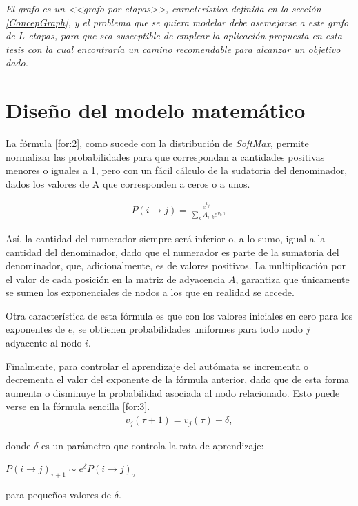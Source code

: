 \textit{El grafo es un <<grafo por etapas>>, característica definida en la sección \ref{ConcepGraph}, y el problema que se quiera modelar debe asemejarse a este grafo de $L$ etapas, para que sea susceptible de emplear la aplicación propuesta en esta tesis con la cual encontraría un camino recomendable para alcanzar un objetivo dado.}

\section{Diseño del modelo matemático}
\label{mat}
La fórmula \ref{for:2}, como sucede con la distribución de \textit{SoftMax}, permite normalizar las probabilidades para que correspondan a cantidades positivas menores o iguales a 1, pero con un fácil cálculo de la sudatoria del denominador, dados los valores de A que corresponden a ceros o a unos. 

\begin{eqnarray}\label{for:2}
P(i \to j) = \frac{e^{v_j}}{\sum_k A_{i,k} e^{v_k}},
\end{eqnarray}


Así, la cantidad del numerador siempre será inferior o,  a lo sumo, igual a la cantidad del denominador, dado que el numerador es parte de la sumatoria del denominador, que, adicionalmente, es de valores positivos. La multiplicación por el valor de cada posición en la matriz de adyacencia $A$, garantiza que únicamente se sumen los exponenciales de nodos a los que en realidad se accede. 

Otra característica de esta fórmula es que con los valores iniciales en cero para los exponentes de $e$, se obtienen probabilidades uniformes para todo nodo $j$ adyacente al nodo $i$.

Finalmente, para controlar el aprendizaje del autómata se incrementa o decrementa el valor del exponente de la fórmula anterior, dado que de esta forma aumenta o disminuye la probabilidad asociada al nodo relacionado. Esto puede verse en la fórmula sencilla \ref{for:3}.
\begin{eqnarray}\label{for:3}
v_j(\tau + 1) = v_j(\tau) + \delta,
\end{eqnarray}

donde $\delta$ es un parámetro que controla la rata de aprendizaje:

$P(i \to j)_{\tau+1} \sim e^{\delta} P(i \to j)_{\tau}$ 

para pequeños valores de $\delta$.



